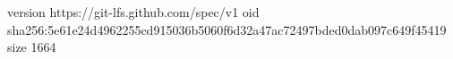 version https://git-lfs.github.com/spec/v1
oid sha256:5e61e24d4962255cd915036b5060f6d32a47ac72497bded0dab097c649f45419
size 1664
